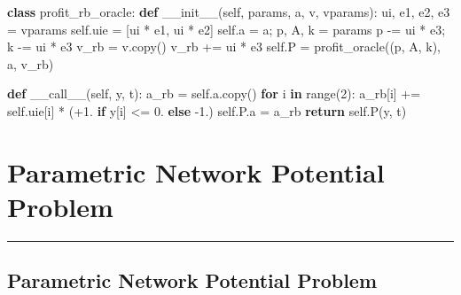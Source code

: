 \documentclass[]{article}
\newenvironment{Shaded}{}{}
\newcommand{\BuiltInTok}[1]{#1}
\newcommand{\ControlFlowTok}[1]{\textcolor[rgb]{0.00,0.44,0.13}{\textbf{#1}}}
\newcommand{\DecValTok}[1]{\textcolor[rgb]{0.25,0.63,0.44}{#1}}
\newcommand{\FloatTok}[1]{\textcolor[rgb]{0.25,0.63,0.44}{#1}}
\newcommand{\FunctionTok}[1]{\textcolor[rgb]{0.02,0.16,0.49}{#1}}
\newcommand{\KeywordTok}[1]{\textcolor[rgb]{0.00,0.44,0.13}{\textbf{#1}}}
\newcommand{\NormalTok}[1]{#1}
\newcommand{\OperatorTok}[1]{\textcolor[rgb]{0.40,0.40,0.40}{#1}}
\newcommand{\VariableTok}[1]{\textcolor[rgb]{0.10,0.09,0.49}{#1}}
\begin{document}
\begin{Shaded}
\begin{Highlighting}[]
\KeywordTok{class}\NormalTok{ profit_rb_oracle:}
    \KeywordTok{def} \FunctionTok{__init__}\NormalTok{(}\VariableTok{self}\NormalTok{, params, a, v, vparams):}
\NormalTok{        ui, e1, e2, e3 }\OperatorTok{=}\NormalTok{ vparams}
        \VariableTok{self}\NormalTok{.uie }\OperatorTok{=}\NormalTok{ [ui }\OperatorTok{*}\NormalTok{ e1, ui }\OperatorTok{*}\NormalTok{ e2]}
        \VariableTok{self}\NormalTok{.a }\OperatorTok{=}\NormalTok{ a}\OperatorTok{;}\NormalTok{ p, A, k }\OperatorTok{=}\NormalTok{ params}
\NormalTok{        p }\OperatorTok{-=}\NormalTok{ ui }\OperatorTok{*}\NormalTok{ e3}\OperatorTok{;}\NormalTok{ k }\OperatorTok{-=}\NormalTok{ ui }\OperatorTok{*}\NormalTok{ e3}
\NormalTok{        v_rb }\OperatorTok{=}\NormalTok{ v.copy()}
\NormalTok{        v_rb }\OperatorTok{+=}\NormalTok{ ui }\OperatorTok{*}\NormalTok{ e3}
        \VariableTok{self}\NormalTok{.P }\OperatorTok{=}\NormalTok{ profit_oracle((p, A, k), a, v_rb)}

    \KeywordTok{def} \FunctionTok{__call__}\NormalTok{(}\VariableTok{self}\NormalTok{, y, t):}
\NormalTok{        a_rb }\OperatorTok{=} \VariableTok{self}\NormalTok{.a.copy()}
        \ControlFlowTok{for}\NormalTok{ i }\KeywordTok{in} \BuiltInTok{range}\NormalTok{(}\DecValTok{2}\NormalTok{):}
\NormalTok{            a_rb[i] }\OperatorTok{+=} \VariableTok{self}\NormalTok{.uie[i] }\OperatorTok{*}\NormalTok{ (}\OperatorTok{+}\FloatTok{1.}
                        \ControlFlowTok{if}\NormalTok{ y[i] }\OperatorTok{<=} \FloatTok{0.} \ControlFlowTok{else} \FloatTok{-1.}\NormalTok{)}
        \VariableTok{self}\NormalTok{.P.a }\OperatorTok{=}\NormalTok{ a_rb}
        \ControlFlowTok{return} \VariableTok{self}\NormalTok{.P(y, t)}
\end{Highlighting}
\end{Shaded}

\hypertarget{parametric-network-potential-problem}{%
\section{Parametric Network Potential
Problem}\label{parametric-network-potential-problem}}

\begin{center}\rule{0.5\linewidth}{\linethickness}\end{center}

\hypertarget{parametric-network-potential-problem-1}{%
\subsection{Parametric Network Potential
Problem}\label{parametric-network-potential-problem-1}}
\end{document}
